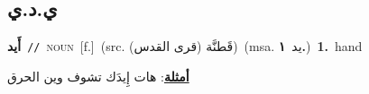 \documentclass[10pt,a4paper,twoside]{article} %
\begin{document}
\begin{multicols}{2}
{{\vspace{-3mm}
\subsection*{\color{blue}\foreignlanguage{arabic}{ي.د.ي}\color{blue}{}} 

{\setlength\topsep{0pt}\textbf{\foreignlanguage{arabic}{أَيد}}\ {\color{gray}\texttt{//}\color{black}}\ \textsc{noun}\ [f.]\ (src. \color{gray}\foreignlanguage{arabic}{قَطنَّة (قرى القدس)}\color{black})\ \color{gray}(msa. \foreignlanguage{arabic}{يد}~\foreignlanguage{arabic}{\textbf{١.}})\color{black}\ \textbf{1.}~hand\  \begin{flushright}\color{gray}\foreignlanguage{arabic}{\textbf{\underline{\foreignlanguage{arabic}{أمثلة}}}: هات إِيدَك تشوف وين الحرق}\end{flushright}\color{black}} \vspace{2mm}

}}
\end{multicols}
\end{document}
